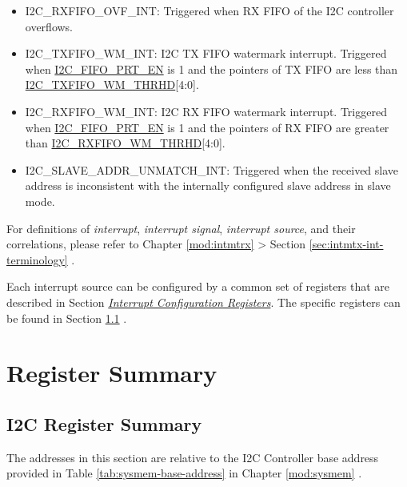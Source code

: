 \documentclass[main\_\_EN.tex]{subfiles}
\begin{document}
\begin{itemize}
\item \label{int:i2c-rxfifo-ovf}I2C\_RXFIFO\_OVF\_INT: Triggered when RX FIFO of the I2C controller overflows.
\item \label{int:i2c-txfifo-wm}I2C\_TXFIFO\_WM\_INT: I2C TX FIFO watermark interrupt. Triggered when \hyperref[fielddesc:I2CFIFOPRTEN]{I2C\_FIFO\_PRT\_EN} is 1 and the pointers of TX FIFO are less than \hyperref[fielddesc:I2CTXFIFOWMTHRHD]{I2C\_TXFIFO\_WM\_THRHD}[4:0].
\item \label{int:i2c-rxfifo-wm}I2C\_RXFIFO\_WM\_INT: I2C RX FIFO watermark interrupt. Triggered when \hyperref[fielddesc:I2CFIFOPRTEN]{I2C\_FIFO\_PRT\_EN} is 1 and the pointers of RX FIFO are greater than \hyperref[fielddesc:I2CRXFIFOWMTHRHD]{I2C\_RXFIFO\_WM\_THRHD}[4:0].
\item I2C\_SLAVE\_ADDR\_UNMATCH\_INT: Triggered when the received slave address is inconsistent with the internally configured slave address in slave mode.
\end{itemize}





\begin{tiplisting}
For definitions of \textit{interrupt}, \textit{interrupt signal}, \textit{interrupt source}, and their correlations, please refer to Chapter \ref{mod:intmtrx} \textit{} > Section \ref{sec:intmtx-int-terminology} \textit{}.
\end{tiplisting}

Each interrupt source can be configured by a common set of registers that are described in Section \hyperref[interrupt-config-registers]{\textit{Interrupt Configuration Registers}}. The specific registers can be found in Section \ref{sec:i2c-reg-summ} \textit{}.


\newpage
\section{Register Summary}

\subsection{I2C Register Summary}
\label{sec:i2c-reg-summ}
\hypertarget{i2c-reg-summ}{}

The addresses in this section are relative to the I2C Controller base address provided in Table \ref{tab:sysmem-base-address} in Chapter \ref{mod:sysmem} \textit{}.
\end{document}
